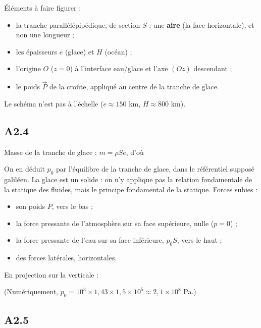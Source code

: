 \documentclass[11pt,a4paper]{article}
\providecommand{\tightlist}{\setlength{\itemsep}{0pt}\setlength{\parskip}{0pt}}
\newcommand{\equationajustee}[1]{%
  \sbox{\boiteequation}{$\displaystyle #1$}%
  \ifdim\wd\boiteequation>\linewidth
    \[\resizebox{\linewidth}{!}{\usebox{\boiteequation}}\]%
  \else
    \[#1\]%
  \fi}
\begin{document}
Éléments à faire figurer :

\begin{itemize}
\tightlist
\item
  la tranche parallélépipédique, de section \(S\) : une \textbf{aire} (la face horizontale), et non une longueur ;
\item
  les épaisseurs \(e\) (glace) et \(H\) (océan) ;
\item
  l'origine \(O\) (\(z = 0\)) à l'interface eau/glace et l'axe \((Oz)\) descendant ;
\item
  le poids \(\vec P\) de la croûte, appliqué au centre de la tranche de glace.
\end{itemize}

Le schéma n'est pas à l'échelle (\(e \approx 150\) km, \(H \approx 800\) km).

\hypertarget{a2.4}{%
\subsection{A2.4}\label{a2.4}}

Masse de la tranche de glace : \(m = \rho S e\), d'où

\equationajustee{\boxed{P = \rho\,S\,e\,g}}

On en déduit \(p_0\) par l'équilibre de la tranche de glace, dans le référentiel supposé galiléen. La glace est un solide : on n'y applique pas la relation fondamentale de la statique des fluides, mais le principe fondamental de la statique. Forces subies :

\begin{itemize}
\tightlist
\item
  son poids \(P\), vers le bas ;
\item
  la force pressante de l'atmosphère sur sa face supérieure, nulle (\(p = 0\)) ;
\item
  la force pressante de l'eau sur sa face inférieure, \(p_0 S\), vers le haut ;
\item
  des forces latérales, horizontales.
\end{itemize}

En projection sur la verticale :

\equationajustee{p_0 S - \rho S e g = 0}

\equationajustee{\boxed{p_0 = \rho\,g\,e}}

(Numériquement, \(p_0 = 10^3 \times 1{,}43 \times 1{,}5\times10^{5} \approx 2{,}1\times10^{8}\) Pa.)

\hypertarget{a2.5}{%
\subsection{A2.5}\label{a2.5}}
\end{document}
